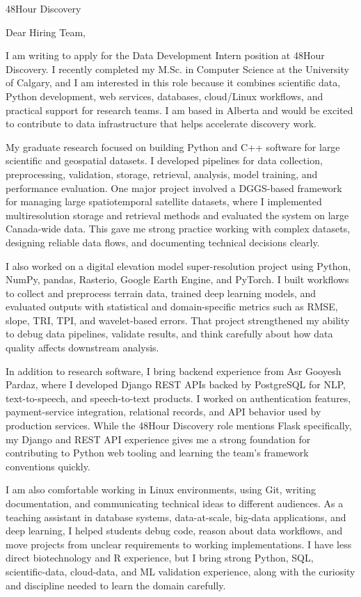 \documentclass[11pt]{letter}
\begin{document}
\begin{letter}{48Hour Discovery}

\opening{Dear Hiring Team,}

I am writing to apply for the Data Development Intern position at 48Hour Discovery. I recently completed my M.Sc. in Computer Science at the University of Calgary, and I am interested in this role because it combines scientific data, Python development, web services, databases, cloud/Linux workflows, and practical support for research teams. I am based in Alberta and would be excited to contribute to data infrastructure that helps accelerate discovery work.

My graduate research focused on building Python and C++ software for large scientific and geospatial datasets. I developed pipelines for data collection, preprocessing, validation, storage, retrieval, analysis, model training, and performance evaluation. One major project involved a DGGS-based framework for managing large spatiotemporal satellite datasets, where I implemented multiresolution storage and retrieval methods and evaluated the system on large Canada-wide data. This gave me strong practice working with complex datasets, designing reliable data flows, and documenting technical decisions clearly.

I also worked on a digital elevation model super-resolution project using Python, NumPy, pandas, Rasterio, Google Earth Engine, and PyTorch. I built workflows to collect and preprocess terrain data, trained deep learning models, and evaluated outputs with statistical and domain-specific metrics such as RMSE, slope, TRI, TPI, and wavelet-based errors. That project strengthened my ability to debug data pipelines, validate results, and think carefully about how data quality affects downstream analysis.

In addition to research software, I bring backend experience from Asr Gooyesh Pardaz, where I developed Django REST APIs backed by PostgreSQL for NLP, text-to-speech, and speech-to-text products. I worked on authentication features, payment-service integration, relational records, and API behavior used by production services. While the 48Hour Discovery role mentions Flask specifically, my Django and REST API experience gives me a strong foundation for contributing to Python web tooling and learning the team's framework conventions quickly.

I am also comfortable working in Linux environments, using Git, writing documentation, and communicating technical ideas to different audiences. As a teaching assistant in database systems, data-at-scale, big-data applications, and deep learning, I helped students debug code, reason about data workflows, and move projects from unclear requirements to working implementations. I have less direct biotechnology and R experience, but I bring strong Python, SQL, scientific-data, cloud-data, and ML validation experience, along with the curiosity and discipline needed to learn the domain carefully.


\end{letter}
\end{document}
